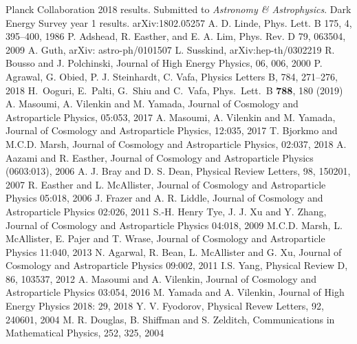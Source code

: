 \documentclass[12pt]{article}
\begin{document}
 

\begin{thebibliography}{99}
 Planck Collaboration 2018 results. Submitted to \emph{Astronomy \& Astrophysics}.
 Dark Energy Survey year 1 results. arXiv:1802.05257
 A. D. Linde, Phys. Lett. B 175, 4, 395--400, 1986
 P. Adshead, R. Easther, and E. A. Lim, Phys. Rev. D 79, 063504, 2009
 A. Guth, arXiv: astro-ph/0101507
 L. Susskind, arXiv:hep-th/0302219
 R. Bousso and J. Polchinski, Journal of High Energy Physics, 06, 006, 2000
 P. Agrawal, G. Obied, P. J. Steinhardt, C. Vafa, Physics Letters B, 784, 271--276, 2018
  H.~Ooguri, E.~Palti, G.~Shiu and C.~Vafa,   Phys.\ Lett.\ B {\bf 788}, 180 (2019)
 A. Masoumi, A. Vilenkin and M. Yamada, Journal of Cosmology and Astroparticle Physics, 05:053, 2017
 A. Masoumi, A. Vilenkin and M. Yamada, Journal of Cosmology and Astroparticle Physics, 12:035, 2017
 T. Bjorkmo and M.C.D. Marsh, Journal of Cosmology and Astroparticle Physics, 02:037, 2018
 A. Aazami and R. Easther, Journal of Cosmology and Astroparticle Physics (0603:013), 2006
 A. J. Bray and D. S. Dean, Physical Review Letters, 98, 150201, 2007
 R. Easther and L. McAllister, Journal of Cosmology and Astroparticle Physics 05:018, 2006
 J. Frazer and A. R. Liddle, Journal of Cosmology and Astroparticle Physics 02:026, 2011
 S.-H. Henry Tye, J. J. Xu and Y. Zhang, Journal of Cosmology and Astroparticle Physics 04:018, 2009
 M.C.D. Marsh, L. McAllister, E. Pajer and T. Wrase, Journal of Cosmology and Astroparticle Physics 11:040, 2013
 N. Agarwal, R. Bean, L. McAllister and G. Xu, Journal of Cosmology and Astroparticle Physics 09:002, 2011
 I.S. Yang, Physical Review D, 86, 103537, 2012
 A. Masoumi and A. Vilenkin, Journal of Cosmology and Astroparticle Physics 03:054, 2016
 M. Yamada and A. Vilenkin, Journal of High Energy Physics 2018: 29, 2018
 Y. V. Fyodorov, Physical Revew Letters, 92, 240601, 2004
 M. R. Douglas, B. Shiffman and S. Zelditch, Communications in Mathematical Physics, 252, 325, 2004

\end{thebibliography}
\end{document}
